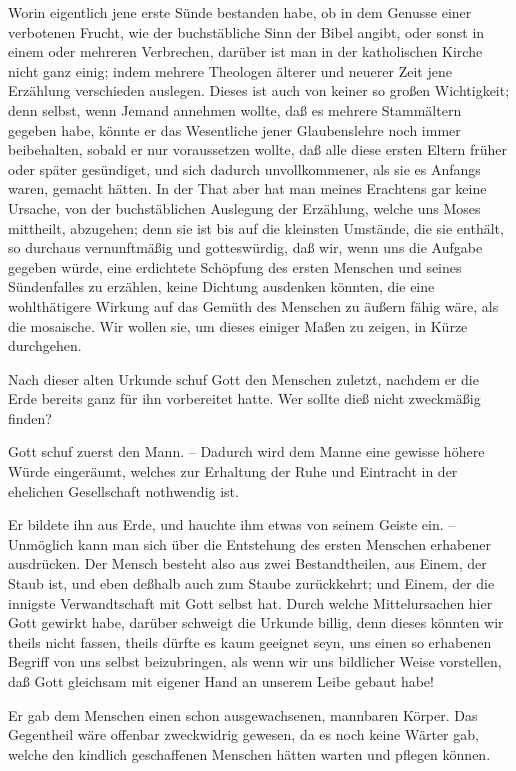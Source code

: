 \begin{RWanm} 
Worin eigentlich jene erste Sünde bestanden habe, ob in dem Genusse einer verbotenen Frucht, wie der buchstäbliche Sinn der Bibel angibt, oder sonst in einem oder mehreren Verbrechen, darüber ist man in der katholischen Kirche nicht ganz einig; indem mehrere Theologen älterer und neuerer Zeit jene Erzählung verschieden auslegen. Dieses ist auch von keiner so großen Wichtigkeit; denn selbst, wenn Jemand annehmen wollte, daß es mehrere Stammältern gegeben habe, könnte er das Wesentliche jener Glaubenslehre noch immer beibehalten, sobald er nur voraussetzen wollte, daß alle diese ersten Eltern früher oder später gesündiget, und sich dadurch unvollkommener, als sie es Anfangs waren, gemacht hätten. In der That aber hat man meines Erachtens gar keine Ursache, von der buchstäblichen Auslegung der Erzählung, welche uns Moses mittheilt, abzugehen; denn sie ist bis auf die kleinsten Umstände, die sie enthält, so durchaus vernunftmäßig und gotteswürdig, daß wir, wenn uns die Aufgabe gegeben würde, eine erdichtete Schöpfung des ersten Menschen und seines Sündenfalles zu erzählen, keine Dichtung ausdenken könnten, die eine wohlthätigere Wirkung auf das Gemüth des Menschen zu äußern fähig wäre, als die mosaische. Wir wollen sie, um dieses einiger Maßen zu zeigen, in Kürze durchgehen.
\begin{aufza}
\item Nach dieser alten Urkunde schuf Gott den Menschen zuletzt, nachdem er die Erde bereits ganz für ihn vorbereitet hatte. Wer sollte dieß nicht zweckmäßig finden?
\item Gott schuf zuerst den Mann. -- Dadurch wird dem Manne eine gewisse höhere Würde eingeräumt, welches zur Erhaltung der Ruhe und Eintracht in der ehelichen Gesellschaft nothwendig ist.
\item Er bildete ihn aus Erde, und hauchte ihm etwas von seinem Geiste ein. -- Unmöglich kann man sich über die Entstehung des ersten Menschen erhabener ausdrücken. Der Mensch besteht also aus zwei Bestandtheilen, aus Einem, der Staub ist, und eben deßhalb auch zum Staube zurückkehrt; und Einem, der die innigste Verwandtschaft mit Gott selbst hat. Durch welche Mittelursachen hier Gott gewirkt habe, darüber schweigt die Urkunde billig, denn dieses könnten wir theils nicht fassen, theils dürfte es kaum geeignet seyn, uns einen so erhabenen Begriff von uns selbst beizubringen, als wenn wir uns bildlicher Weise vorstellen, daß Gott gleichsam mit eigener Hand an unserem Leibe gebaut habe!
\item Er gab dem Menschen einen schon ausgewachsenen, mannbaren Körper. Das Gegentheil wäre offenbar zweckwidrig gewesen, da es noch keine Wärter gab, welche den kindlich geschaffenen Menschen hätten warten und pflegen können.

\end{aufza}
\end{RWanm}
